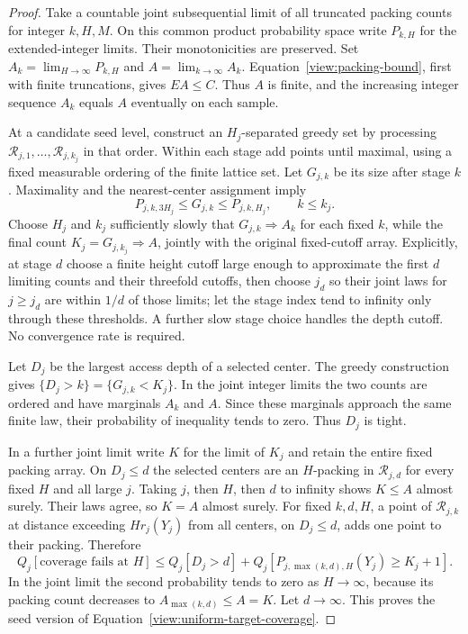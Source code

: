 \begin{proof}
Take a countable joint subsequential limit of all truncated packing
counts for integer $k,H,M$.  On this common product probability space
write $P_{k,H}$ for the extended-integer limits.  Their monotonicities are
preserved.  Set $A_k=\lim_{H\to\infty}P_{k,H}$ and
$A=\lim_{k\to\infty}A_k$.  Equation~\eqref{view:packing-bound}, first
with finite truncations, gives $EA\le C$.  Thus $A$ is finite, and the
increasing integer sequence $A_k$ equals $A$ eventually on each sample.

At a candidate seed level, construct an $H_j$-separated greedy set by
processing $\mathcal R_{j,1},\ldots,\mathcal R_{j,k_j}$ in that order.
Within each stage add points until maximal, using a fixed measurable
ordering of the finite lattice set.  Let $G_{j,k}$ be its size after
stage $k$.  Maximality and the nearest-center assignment imply
\[
 P_{j,k,3H_j}\le G_{j,k}\le P_{j,k,H_j},\qquad k\le k_j.
\]
Choose $H_j$ and $k_j$ sufficiently slowly that
$G_{j,k}\Rightarrow A_k$ for each fixed $k$, while the final count
$K_j=G_{j,k_j}\Rightarrow A$, jointly with the original fixed-cutoff
array.  Explicitly, at stage $d$ choose a finite height cutoff large
enough to approximate the first $d$ limiting counts and their threefold
cutoffs, then choose $j_d$ so their joint laws for $j\ge j_d$ are within
$1/d$ of those limits; let the stage index tend to infinity only through
these thresholds.  A further slow stage choice handles the depth cutoff.
No convergence rate is required.

Let $D_j$ be the largest access depth of a selected center.  The greedy
construction gives $\{D_j>k\}=\{G_{j,k}<K_j\}$.  In the joint integer
limits the two counts are ordered and have marginals $A_k$ and $A$.
Since these marginals approach the same finite law, their probability of
inequality tends to zero.  Thus $D_j$ is tight.

In a further joint limit write $K$ for the limit of $K_j$ and retain the
entire fixed packing array.  On $D_j\le d$ the selected centers are an
$H$-packing in $\mathcal R_{j,d}$ for every fixed $H$ and all large $j$.
Taking $j$, then $H$, then $d$ to infinity shows $K\le A$ almost surely.
Their laws agree, so $K=A$ almost surely.  For fixed $k,d,H$, a point of
$\mathcal R_{j,k}$ at distance exceeding $Hr_j(Y_j)$ from all centers,
on $D_j\le d$, adds one point to their packing.  Therefore
\[
 Q_j[\text{coverage fails at }H]
 \le Q_j[D_j>d]+Q_j[P_{j,\max(k,d),H}(Y_j)\ge K_j+1].
\]
In the joint limit the second probability tends to zero as $H\to\infty$,
because its packing count decreases to $A_{\max(k,d)}\le A=K$.
Let $d\to\infty$.  This proves the seed version of
Equation~\eqref{view:uniform-target-coverage}.


\end{proof}
